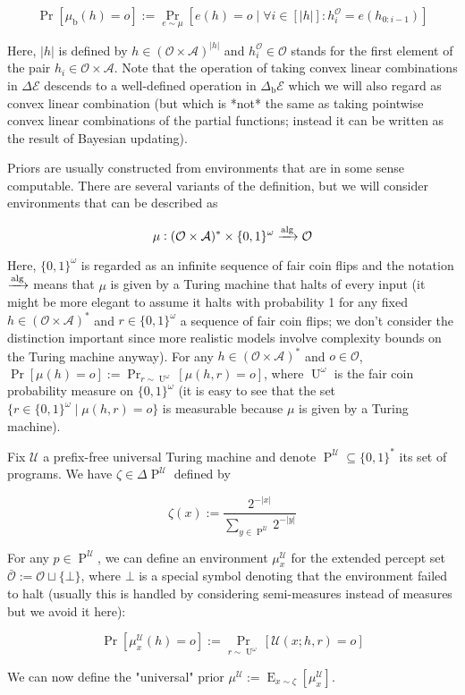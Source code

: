 \documentclass[a4paper]{article}
\newcommand{\Bool}{\{0,1\}}
\newcommand{\Words}{{\Bool^*}}
\newcommand{\Sagas}{{\Bool^\omega}}
\DeclareMathOperator{\Prb}{Pr}
\DeclareMathOperator{\E}{E}
\DeclareMathOperator{\Un}{U}
\newcommand{\Abs}[1]{\lvert #1 \rvert}
\newcommand{\Alg}{\xrightarrow{\textnormal{alg}}}
\newcommand{\UTM}{\mathcal{U}}
\newcommand{\SP}[1]{\Delta #1}
\newcommand{\Act}{\mathcal{A}}
\newcommand{\Per}{\mathcal{O}}
\newcommand{\His}{(\Per \times \Act)^*}
\newcommand{\Env}{\mathcal{E}}
\newcommand{\Beh}{\Delta_{\operatorname{b}}}
\newcommand{\EnvB}{\Beh\Env}
\newcommand{\Prog}{\operatorname{P}^\UTM}
\begin{document}
$$\Prb[\mu_{\operatorname{b}}(h)=o]:=\Prb_{e \sim \mu}[e(h) = o \mid \forall i \in [\Abs{h}]: h^\Per_{i} = e(h_{0:i-1})]$$

Here, ${\Abs{h}}$ is defined by ${h \in (\Per \times \Act)^{\Abs{h}}}$ and ${h^\Per_{i} \in \Per}$ stands for the first element of the pair ${h_i \in \Per \times \Act}$. Note that the operation of taking convex linear combinations in ${\SP{\Env}}$ descends to a well-defined operation in ${\EnvB}$ which we will also regard as convex linear combination (but which is *not* the same as taking pointwise convex linear combinations of the partial functions; instead it can be written as the result of Bayesian updating). 

Priors are usually constructed from environments that are in some sense computable. There are several variants of the definition, but we will consider environments that can be described as

$${\mu: \His \times \Sagas \Alg \Per}$$

Here, ${\Sagas}$ is regarded as an infinite sequence of fair coin flips and the notation ${\Alg}$ means that ${\mu}$ is given by a Turing machine that halts of every input (it might be more elegant to assume it halts with probability 1 for any fixed ${h \in \His}$ and ${r \in \Sagas}$ a sequence of fair coin flips; we don't consider the distinction important since more realistic models involve complexity bounds on the Turing machine anyway). For any ${h \in \His}$ and ${o \in \Per}$, ${\Prb[\mu(h)=o]:=\Prb_{r \sim \Un^\omega}[\mu(h,r)=o]}$, where ${\Un^\omega}$ is the fair coin probability measure on ${\Sagas}$ (it is easy to see that the set ${\{r \in \Sagas \mid \mu(h,r)=o\}}$ is measurable because ${\mu}$ is given by a Turing machine). 

Fix ${\UTM}$ a prefix-free universal Turing machine and denote ${\Prog \subseteq \Words}$ its set of programs. We have ${\zeta \in \SP{\Prog}}$ defined by

$${\zeta(x):=\frac{2^{-\Abs{x}}}{\sum_{y \in \Prog} 2^{-\Abs{y}}}}$$

For any ${p \in \Prog}$, we can define an environment ${\mu_x^\UTM}$ for the extended percept set ${\bar{\Per}:=\Per \sqcup \{\bot\}}$, where ${\bot}$ is a special symbol denoting that the environment failed to halt (usually this is handled by considering semi-measures instead of measures but we avoid it here): 

$$\Pr[\mu_x^\UTM(h)=o]:=\Prb_{r \sim \Un^\omega}[\UTM(x;h,r)=o]$$ 

We can now define the "universal" prior ${\mu^\UTM:=\E_{x \sim \zeta}[\mu_x^\UTM]}$.
\end{document}

